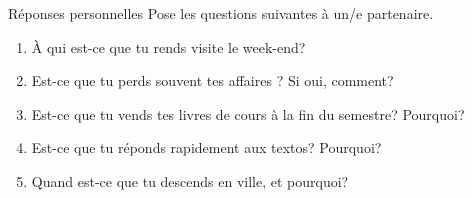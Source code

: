 \documentclass{beamer}
\begin{document}
  \begin{frame}{Réponses personnelles}
    Pose les questions suivantes à un/e partenaire. \\
    \begin{center}
      \begin{enumerate}
        \item À qui est-ce que tu rends visite le week-end?
        \item Est-ce que tu perds souvent tes affaires ? Si oui, comment?
        \item Est-ce que tu vends tes livres de cours à la fin du semestre? Pourquoi?
        \item Est-ce que tu réponds rapidement aux textos? Pourquoi?
        \item Quand est-ce que tu descends en ville, et pourquoi?
      \end{enumerate}
    \end{center}
  \end{frame}
\end{document}
